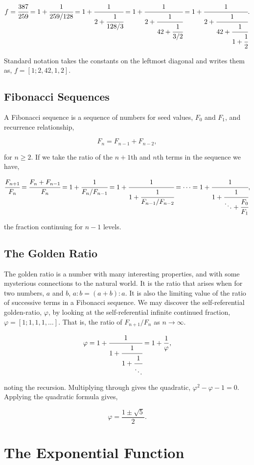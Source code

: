 \documentclass[11pt]{amsart}
\begin{document}
$$
f = \cfrac{387}{259}
= 1 + \cfrac{1}{259/128}
= 1 + \cfrac{1}{2 + \cfrac{1}{128/3}} 
= 1 + \cfrac{1}{2 + \cfrac{1}{42 + \cfrac{1}{3/2}}} 
= 1 + \cfrac{1}{2 + \cfrac{1}{42 + \cfrac{1}{1 + \cfrac{1}{2}}}}.
$$

Standard notation takes the constants on the leftmost diagonal and writes them as, $f = [1; 2, 42, 1, 2]$.

\subsection{Fibonacci Sequences}

A Fibonacci sequence is a sequence of numbers for seed values, $F_0$ and $F_1$, and recurrence relationship,

$$F_n = F_{n-1} + F_{n-2},$$

for $n \geq 2$. If we take the ratio of the $n+1$th and $n$th terms in the sequence we have,

$$
\cfrac{F_{n+1}}{F_n}
= \cfrac{F_n + F_{n - 1}}{F_n}
= 1 + \cfrac{1}{F_{n}/F_{n - 1}}
= 1 + \cfrac{1}{1 + \cfrac{1}{F_{n-1}/F_{n - 2}}}
= \cdots
= 1 + \cfrac{1}{1 + \cfrac{1}{\ddots + \cfrac{F_0}{F_1}}},
$$

the fraction continuing for $n - 1$ levels.

\subsection{The Golden Ratio}

The golden ratio is a number with many interesting properties, and with some mysterious connections to the natural world. It is the ratio that arises when for two numbers, $a$ and $b$, $a : b = (a + b) : a$. It is also the limiting value of the ratio of successive terms in a Fibonacci sequence. We may discover the self-referential golden-ratio, $\varphi$, by looking at the self-referential infinite continued fraction, $\varphi = [1; 1, 1, 1, \dots]$. That is, the ratio of $F_{n+1}/F_n$ as $n \to \infty$.

$$
\varphi = 1 + \cfrac{1}{1 + \cfrac{1}{1 + \cfrac{1}{\ddots}}} = 1 + \frac{1}{\varphi},
$$

noting the recursion. Multiplying through gives the quadratic, $\varphi^2 - \varphi - 1 = 0$. Applying the quadratic formula gives,

$$\varphi = \frac{1 \pm \sqrt{5}}{2}.$$

\section{The Exponential Function}
\end{document}
